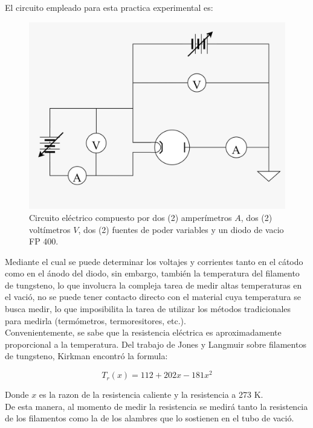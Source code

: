 \documentclass[%
 reprint,
 amsmath,amssymb,
 aps,
]{revtex4-2}
\begin{document}
El circuito empleado para esta practica experimental es:
\\

\begin{figure}[H]
    \centering
    \includegraphics[width=0.8\linewidth]{imagenes/circuito.jpeg}
    \caption{Circuito eléctrico compuesto por dos (2) amperímetros $A$, dos (2) voltímetros $V$, dos (2) fuentes de poder variables y un diodo de vacio FP 400.}
    \label{fig:enter-label}
\end{figure}

Mediante el cual se puede determinar los voltajes y corrientes tanto en el cátodo como en el ánodo del diodo, sin embargo, también la temperatura del filamento de tungsteno, lo que involucra la compleja tarea de medir altas temperaturas en el vació, no se puede tener contacto directo con el material cuya temperatura se busca medir, lo que imposibilita la tarea de utilizar los métodos tradicionales para medirla (termómetros, termoresitores, etc.).
\\

Convenientemente, se sabe que la resistencia eléctrica es aproximadamente proporcional a la temperatura. Del trabajo de Jones y Langmuir \cite{jones} sobre filamentos de tungsteno, Kirkman encontró la formula:

\begin{equation}
    T_{r}(x) = 112 +202x -181x^2
    \label{eq: Kirkman}
\end{equation}
    
\vspace{0.2 cm}
Donde $x$ es la razon de la resistencia caliente y la resistencia a 273 K.
\\

De esta manera, al momento de medir la resistencia se medirá tanto la resistencia de los filamentos como la de los alambres que lo sostienen en el tubo de vació.
\end{document}
